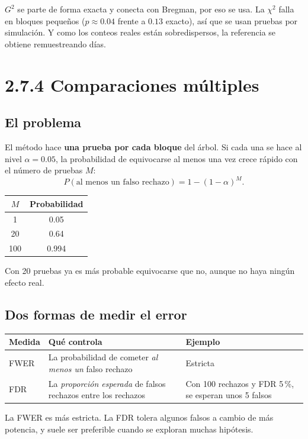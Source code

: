 \documentclass[11pt,a4paper]{article}
\newenvironment{idea}{\par\begin{center}\begin{lrbox}{\ideabox}\begin{minipage}{0.9\linewidth}}{\end{minipage}\end{lrbox}\fcolorbox{blue!40!black}{blue!5}{\usebox{\ideabox}}\end{center}}
\begin{document}
\begin{idea}
$G^2$ se parte de forma exacta y conecta con Bregman, por eso se usa. La $\chi^2$
falla en bloques pequeños ($p\approx0.04$ frente a $0.13$ exacto), así que se usan
pruebas por simulación. Y como los conteos reales están sobredispersos, la
referencia se obtiene remuestreando días.
\end{idea}

\section{2.7.4 Comparaciones múltiples}

\subsection{El problema}

El método hace \textbf{una prueba por cada bloque} del árbol. Si cada una se hace al
nivel $\alpha=0.05$, la probabilidad de equivocarse al menos una vez crece rápido
con el número de pruebas $M$:
\[
  P(\text{al menos un falso rechazo})=1-(1-\alpha)^M.
\]
\begin{center}
\begin{tabular}{cc}
\toprule
$M$ & Probabilidad \\
\midrule
1 & 0.05 \\
20 & 0.64 \\
100 & 0.994 \\
\bottomrule
\end{tabular}
\end{center}
Con 20 pruebas ya es más probable equivocarse que no, aunque no haya ningún efecto
real.

\subsection{Dos formas de medir el error}

\begin{center}
\renewcommand{\arraystretch}{1.3}
\begin{tabular}{@{}l>{\raggedright\arraybackslash}p{6.4cm}>{\raggedright\arraybackslash}p{4.2cm}@{}}
\toprule
\textbf{Medida} & \textbf{Qué controla} & \textbf{Ejemplo} \\
\midrule
FWER & La probabilidad de cometer \emph{al menos un} falso rechazo & Estricta \\
\midrule
FDR & La \emph{proporción esperada} de falsos rechazos entre los rechazos & Con 100 rechazos y FDR 5\,\%, se esperan unos 5 falsos \\
\bottomrule
\end{tabular}
\end{center}
La FWER es más estricta. La FDR tolera algunos falsos a cambio de más potencia, y
suele ser preferible cuando se exploran muchas hipótesis.
\end{document}
